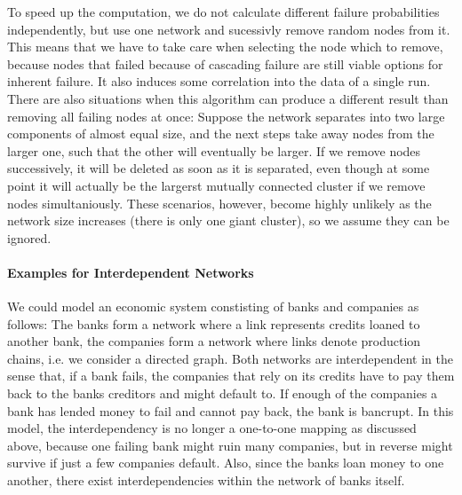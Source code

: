 \documentclass{scrartcl}
\begin{document}
To speed up the computation, we do not calculate different failure probabilities independently, but use one network and sucessivly remove random nodes from it. This means that we have to take care when selecting the node which to remove, because nodes that failed because of cascading failure are still viable options for inherent failure. It also induces some correlation into the data of a single run. 
There are also situations when this algorithm can produce a different result than removing all failing nodes at once: Suppose the network separates into two large components of almost equal size, and the next steps take away nodes from the larger one, such that the other will eventually be larger. If we remove nodes successively, it will be deleted as soon as it is separated, even though at some point it will actually be the largerst mutually connected cluster if we remove nodes simultaniously.
These scenarios, however, become highly unlikely as the network size increases (there is only one giant cluster), so we assume they can be ignored. 

\paragraph{Examples for Interdependent Networks}
We could model an economic system constisting of banks and companies as follows: 
The banks form a network where a link represents credits loaned to another bank, the companies form a network where links denote production chains, i.e. we consider a directed graph. 
Both networks are interdependent in the sense that, if a bank fails, the companies that rely on its credits have to pay them back to the banks creditors and might default to. 
If enough of the companies a bank has lended money to fail and cannot pay back, the bank is bancrupt. 
In this model, the interdependency is no longer a one-to-one mapping as discussed above, because one failing bank might ruin many companies, but in reverse might survive if just a few companies default. 
Also, since the banks loan money to one another, there exist interdependencies within the network of banks itself.

\end{document}
